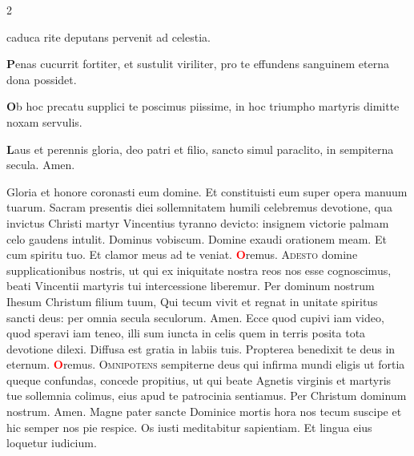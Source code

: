 \begin{multicols}{2}
{caduca rite deputans
pervenit ad celestia.
\par {\bfseries \color{Blue} P}enas cucurrit fortiter,
et sustulit viriliter,
pro te effundens sanguinem
eterna dona possidet.
\par {\bfseries \color{Red} O}b hoc precatu supplici
te poscimus piissime,
in hoc triumpho martyris
dimitte noxam servulis.
\par {\bfseries \color{Blue} L}aus et perennis gloria,
deo patri et filio,
sancto simul paraclito,
in sempiterna secula. Amen.
}
\newline \V Gloria et honore coronasti eum domine. \R Et constituisti eum super opera manuum tuarum.
\newline {} Sacram presentis diei sollemnitatem humili celebremus devotione, qua invictus Christi martyr Vincentius tyranno devicto: insignem victorie palmam celo gaudens intulit.
 Dominus vobiscum.  Domine exaudi orationem meam.
\newline \R Et cum spiritu tuo.  Et clamor meus ad te veniat.
\newline \textcolor{Red}{\bfseries O}remus. 
\lettrine[lines=2]{\zallmancaps \color{Red} A}{desto} domine supplicationibus nostris, ut qui ex iniquitate nostra reos nos esse cognoscimus, beati Vincentii martyris tui intercessione liberemur. Per dominum nostrum Ihesum Christum filium tuum, Qui tecum vivit et regnat in unitate spiritus sancti deus: per omnia secula seculorum. \R Amen.
\newline {}
\newline {} Ecce quod cupivi iam video, quod speravi iam teneo, illi sum iuncta in celis quem in terris posita tota devotione dilexi.
\newline \V Diffusa est gratia in labiis tuis. \R Propterea benedixit te deus in eternum.
\newline \textcolor{Red}{\bfseries O}remus. 
\lettrine[lines=2]{\zallmancaps \color{Red} O}{mnipotens} sempiterne deus qui infirma mundi eligis ut fortia queque confundas, concede propitius, ut qui beate Agnetis virginis et martyris tue sollemnia colimus, eius apud te patrocinia sentiamus. Per Christum dominum nostrum. \R Amen.
\newline {}
\newline {} Magne pater sancte Dominice mortis hora nos tecum suscipe et hic semper nos pie respice.
\newline \V Os iusti meditabitur sapientiam. \R Et lingua eius loquetur iudicium.

\end{multicols}
